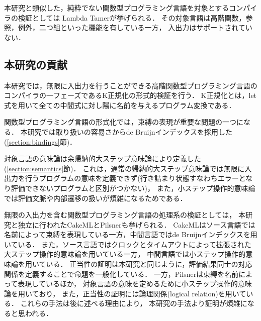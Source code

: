 \documentclass[T]{compsoft}
\begin{document}
本研究と類似した，純粋でない関数型プログラミング言語を対象とするコンパイラの検証としては
Lambda Tamer\cite{ImpurePOPL10}が挙げられる．
その対象言語は高階関数，参照，例外，二つ組といった機能を有している一方，
入出力はサポートされていない．

\subsection{本研究の貢献}
本研究では，無限に入出力を行うことができる高階関数型プログラミング言語のコンパイラの一フェーズであるK正規化の形式的検証を行う．
K正規化とは，let式を用いて全ての中間式に対し陽に名前を与えるプログラム変換である．

%
関数型プログラミング言語の形式化では，束縛の表現が重要な問題の一つになる．
本研究では取り扱いの容易さからde Bruijnインデックスを採用した(\ref{section:bindings}節)．


対象言語の意味論は余帰納的大ステップ意味論により定義した(\ref{section:semantics}節)．
これは，通常の帰納的大ステップ意味論では無限に入出力を行うプログラムの意味を定義できず(行き詰まり状態すなわちエラーとなり評価できないプログラムと区別がつかない)，
また，小ステップ操作的意味論では評価文脈や内部遷移の扱いが煩雑になるためである．

無限の入出力を含む関数型プログラミング言語の処理系の検証としては，
本研究と独立に行われたCakeML\cite{CakeML:ICFP16}とPilsner\cite{DBLP:conf/icfp/NeisHKMDV15}も挙げられる．
CakeMLはソース言語では名前によって束縛を表現している一方，中間言語ではde Bruijnインデックスを用いている．
また，ソース言語ではクロックとタイムアウトによって拡張された大ステップ操作的意味論を用いている一方，
中間言語では小ステップ操作的意味論を用いている．
正当性の証明は本研究と同じように，評価結果同士の対応関係を定義することで命題を一般化している．
一方，Pilsnerは束縛を名前によって表現しているほか，
対象言語の意味を定めるために小ステップ操作的意味論を用いており，
また，正当性の証明には論理関係(logical relation)を用いている．
これらの手法は後に述べる理由により，
本研究の手法より証明が煩雑になると思われる．
\end{document}
